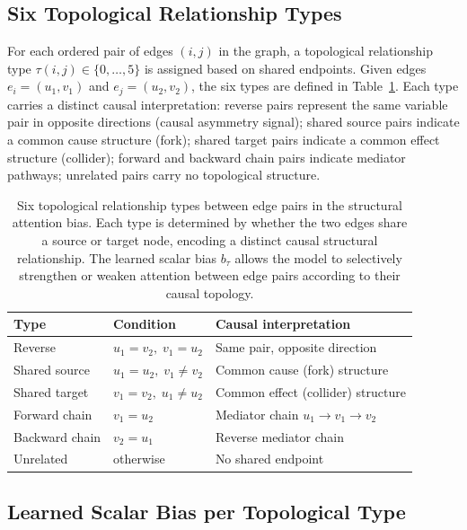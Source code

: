 \subsection{Six Topological Relationship Types}

For each ordered pair of edges $(i, j)$ in the graph, a topological relationship type $\tau(i,j) \in \{0,\ldots,5\}$ is assigned based on shared endpoints. Given edges $e_i = (u_1, v_1)$ and $e_j = (u_2, v_2)$, the six types are defined in Table~\ref{tab:struct_types}. Each type carries a distinct causal interpretation: reverse pairs represent the same variable pair in opposite directions (causal asymmetry signal); shared source pairs indicate a common cause structure (fork); shared target pairs indicate a common effect structure (collider); forward and backward chain pairs indicate mediator pathways; unrelated pairs carry no topological structure.

\begin{table}[ht]
	\centering
	\caption{Six topological relationship types between edge pairs in the structural attention bias. Each type is determined by whether the two edges share a source or target node, encoding a distinct causal structural relationship. The learned scalar bias $b_\tau$ allows the model to selectively strengthen or weaken attention between edge pairs according to their causal topology.}
	\label{tab:struct_types}
	\begin{tabular}{lll}
		\toprule
		\textbf{Type} & \textbf{Condition} & \textbf{Causal interpretation} \\
		\midrule
		Reverse        & $u_1 = v_2,\; v_1 = u_2$ & Same pair, opposite direction \\
		Shared source  & $u_1 = u_2,\; v_1 \neq v_2$ & Common cause (fork) structure \\
		Shared target  & $v_1 = v_2,\; u_1 \neq u_2$ & Common effect (collider) structure \\
		Forward chain  & $v_1 = u_2$ & Mediator chain $u_1 \to v_1 \to v_2$ \\
		Backward chain & $v_2 = u_1$ & Reverse mediator chain \\
		Unrelated     & otherwise & No shared endpoint \\
		\bottomrule
	\end{tabular}
\end{table}

\subsection{Learned Scalar Bias per Topological Type}


